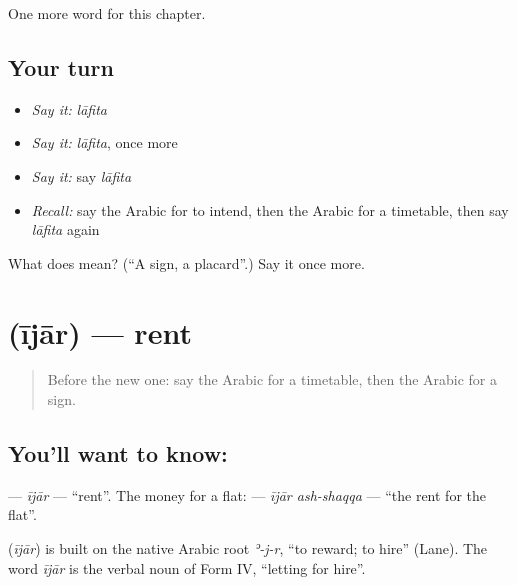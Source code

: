 \begin{grammarlens}[title={What you've built}]
One more word for this chapter.
\end{grammarlens}

\subsection*{Your turn}
\begin{itemize}
\raggedright
  \item \emph{Say it:} \emph{lāfita}
  \item \emph{Say it:} \emph{lāfita}, once more
  \item \emph{Say it:} say \emph{lāfita}
  \item \emph{Recall:} say the Arabic for to intend, then the Arabic for a timetable, then say \emph{lāfita} again
\end{itemize}

\begin{tcolorbox}[breakable,colback=teal!4,colframe=teal!35!black,title={Before you move on}]
What does  mean? (\textquotedblleft{}A sign, a placard\textquotedblright{}.) Say it once more.
\end{tcolorbox}
\section[\texorpdfstring{\ar{إيجار} (ījār)}{إيجار (ījār)}]{ (ījār) — rent}

\label{lesson:AR-C158-ijar}



\begin{quote}
Before the new one: say the Arabic for a timetable, then the Arabic for a sign.
\end{quote}

\subsection*{You'll want to know: }
\textbf{} — \emph{ījār} — \textquotedblleft{}rent\textquotedblright{}. The money for a flat: \textbf{ } — \emph{ījār ash-shaqqa} — \textquotedblleft{}the rent for the flat\textquotedblright{}.

\begin{cousinweb}
\textbf{} (\emph{ījār}) is built on the native Arabic root \emph{ʾ-j-r}, \textquotedblleft{}to reward; to hire\textquotedblright{} (Lane). The word \emph{ījār} is the verbal noun of Form IV, \textquotedblleft{}letting for hire\textquotedblright{}.
\end{cousinweb}

